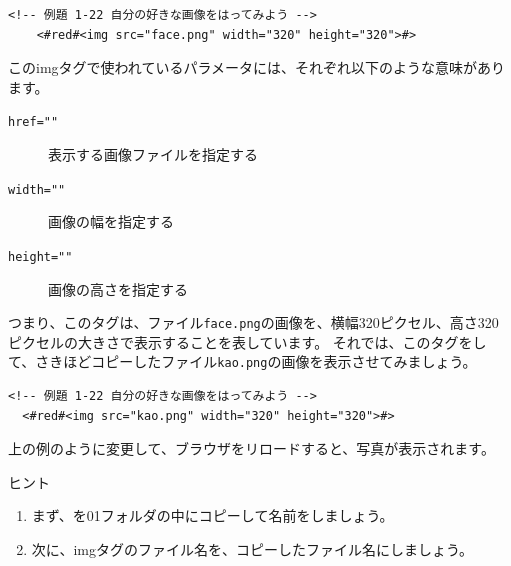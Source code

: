 \documentclass[text01.tex]{subfiles}
\begin{document}
\noindent%
\begin{lstlisting}[caption=\ruby{画像}{がぞう}の表示,label=pwdtest,firstnumber=1]
    <!-- 例題 1-22 自分の好きな画像をはってみよう -->
    <#red#<img src="face.png" width="320" height="320">#> 
\end{lstlisting}

\noindent%
このimgタグで使われているパラメータには、それぞれ以下のような意味があります。

\begin{description}
  \item[\texttt{href=""}]  表示する画像ファイルを指定する
  \item[\texttt{width=""}]  画像の幅を指定する
  \item[\texttt{height=""}]  画像の高さを指定する
\end{description}

\noindent%
つまり、このタグは、ファイル\texttt{face.png}の画像を、横幅320ピクセル、高さ320ピクセルの大きさで表示することを表しています。
それでは、このタグをして、さきほどコピーしたファイル\texttt{kao.png}の画像を表示させてみましょう。
\bigskip


\begin{lstlisting}[caption=\ruby{画像}{がぞう}の表示（\ruby{編集}{へんしゅう}後）,label=pwdtest,firstnumber=1]
  <!-- 例題 1-22 自分の好きな画像をはってみよう -->
  <#red#<img src="kao.png" width="320" height="320">#> 
\end{lstlisting}


\noindent%
上の例のように変更して、ブラウザをリロードすると、写真が表示されます。
\bigskip


\begin{tcolorbox}[title=\useOmetoi,breakable]
  \begin{enumerate}
    ヒント
    \begin{enumerate}
      \item まず、を01フォルダの中にコピーして名前をしましょう。
      \item 次に、imgタグのファイル名を、コピーしたファイル名にしましょう。
    \end{enumerate} 
    \vspace{0.5cm}
  \end{enumerate}
\end{tcolorbox}
\clearpage
\end{document}
